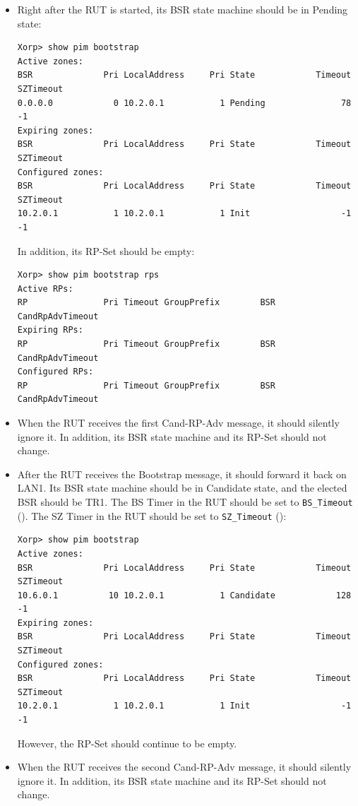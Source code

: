 \documentclass[11pt]{report}
\begin{document}

\begin{itemize}

  \item Right after the RUT is started, its BSR state machine should be in
  Pending state:

\begin{verbatim}
Xorp> show pim bootstrap 
Active zones:
BSR              Pri LocalAddress     Pri State            Timeout SZTimeout
0.0.0.0            0 10.2.0.1           1 Pending               78        -1
Expiring zones:
BSR              Pri LocalAddress     Pri State            Timeout SZTimeout
Configured zones:
BSR              Pri LocalAddress     Pri State            Timeout SZTimeout
10.2.0.1           1 10.2.0.1           1 Init                  -1        -1
\end{verbatim}

  In addition, its RP-Set should be empty:

\begin{verbatim}
Xorp> show pim bootstrap rps 
Active RPs:
RP               Pri Timeout GroupPrefix        BSR         CandRpAdvTimeout
Expiring RPs:
RP               Pri Timeout GroupPrefix        BSR         CandRpAdvTimeout
Configured RPs:
RP               Pri Timeout GroupPrefix        BSR         CandRpAdvTimeout
\end{verbatim}

  \item When the RUT receives the first Cand-RP-Adv message, it should
  silently ignore it. In addition, its BSR state machine and its RP-Set should
  not change.

  \item After the RUT receives the Bootstrap message, it should forward it
        back on LAN1. Its BSR state machine
        should be in Candidate state, and the elected BSR should be TR1.
        The BS Timer in the RUT should be set to \verb=BS_Timeout=
        ({\PimsmBSTimeout}).
        The SZ Timer in the RUT should be set to \verb=SZ_Timeout=
        ({\PimsmSZTimeout}):

\begin{verbatim}
Xorp> show pim bootstrap 
Active zones:
BSR              Pri LocalAddress     Pri State            Timeout SZTimeout
10.6.0.1          10 10.2.0.1           1 Candidate            128        -1
Expiring zones:
BSR              Pri LocalAddress     Pri State            Timeout SZTimeout
Configured zones:
BSR              Pri LocalAddress     Pri State            Timeout SZTimeout
10.2.0.1           1 10.2.0.1           1 Init                  -1        -1
\end{verbatim}

  However, the RP-Set should continue to be empty.

  \item When the RUT receives the second Cand-RP-Adv message, it should
  silently ignore it. In addition, its BSR state machine and its RP-Set should
  not change.

\end{itemize}
\end{document}
